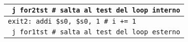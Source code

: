 \documentclass[../main.tex]{subfiles}
\begin{document}
\begin{tabular}{ l }
    \texttt{\hspace*{0cm} \hspace*{0cm} \hspace*{0cm} \hspace*{0cm} \hspace*{0cm} \hspace*{0cm} \hspace*{0cm} \hspace*{0cm} \hspace*{0cm} j for2tst \hspace*{0cm} \hspace*{0cm} \hspace*{0cm} \hspace*{0cm} \hspace*{0cm} \hspace*{0cm} \hspace*{0cm} \hspace*{0cm} \hspace*{0cm} \hspace*{0cm} \hspace*{0cm} \hspace*{0cm} \hspace*{0cm} \# salta al test del loop interno} \\
    \hline
    \hline
    \texttt{exit2:\hspace*{0cm} \hspace*{0cm} \hspace*{0cm} addi \$s0, \$s0, 1 \hspace*{0cm} \hspace*{0cm} \hspace*{0cm} \hspace*{0cm} \hspace*{0cm} \hspace*{0cm} \# i += 1} \\
    \texttt{\hspace*{0cm} \hspace*{0cm} \hspace*{0cm} \hspace*{0cm} \hspace*{0cm} \hspace*{0cm} \hspace*{0cm} \hspace*{0cm} \hspace*{0cm} j for1tst \hspace*{0cm} \hspace*{0cm} \hspace*{0cm} \hspace*{0cm} \hspace*{0cm} \hspace*{0cm} \hspace*{0cm} \hspace*{0cm} \hspace*{0cm} \hspace*{0cm} \hspace*{0cm} \hspace*{0cm} \hspace*{0cm} \# salta al test del loop esterno} \\
    \hline
    \hline
\end{tabular}
\end{document}
